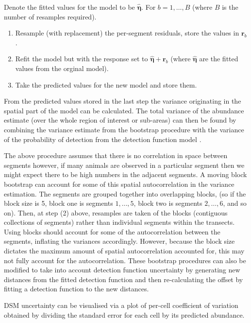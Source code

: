 \documentclass[a4paper,12pt]{article}
\begin{document}
Denote the fitted values for the model to be $\hat{\bm{\eta}}$. For $b=1,\ldots,B$ (where $B$ is the number of resamples required).
\begin{enumerate}
	\item Resample (with replacement) the per-segment residuals, store the values in $\mathbf{r}_{b}$.
	\item Refit the model but with the response set to $\hat{\bm{\eta}}+\mathbf{r}_{b}$ (where $\hat{\bm{\eta}}$ are the fitted values from the orginal model).
	\item Take the predicted values for the new model and store them.
\end{enumerate}
From the predicted values stored in the last step the variance originating in the spatial part of the model can be calculated. The total variance of the abundance estimate (over the whole region of interest or sub-areas) can then be found by combining the variance estimate from the bootstrap procedure with the variance of the probability of detection from the detection function model \citep[using the delta method which assumes that the two components of the variance are independent;][]{Seber:2002ti}.

The above procedure assumes that there is no correlation in space between segments however, if many animals are observed in a particular segment then we might expect there to be high numbers in the adjacent segments. A moving block bootstrap \citep[MBB;][Section 8.6]{Efron:1993tv} can account for some of this spatial autocorrelation in the variance estimation. The segments are grouped together into overlapping blocks, (so if the block size is 5, block one is segments $1,\ldots,5$, block two is segments $2,\ldots,6$, and so on). Then, at step (2) above, resamples are taken of the blocks (contiguous collections of segments) rather than individual segments within the transects. Using blocks should account for some of the autocorrelation between the segments, inflating the variances accordingly. However, because the block size dictates the maximum amount of spatial autocorrelation accounted for, this may not fully account for the autocorrelation. These bootstrap procedures can also be modified to take into account detection function uncertainty by generating new distances from the fitted detection function and then re-calculating the offset by fitting a detection function to the new distances.
 
DSM uncertainty can be visualised via a plot of per-cell coefficient of variation obtained by dividing the standard error for each cell by its predicted abundance. 
\end{document}
